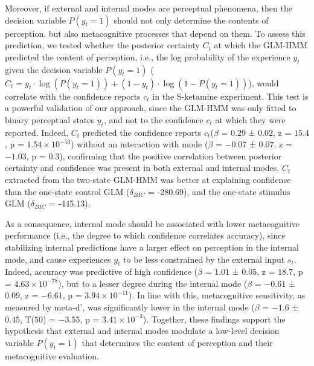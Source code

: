 \documentclass[
]{article}
\begin{document}
Moreover, if external and internal modes are perceptual phenomena, then
the decision variable \(P(y_t = 1)\) should not only determine the
contents of perception, but also metacognitive processes that depend on
them. To assess this prediction, we tested whether the posterior
certainty \(C_t\) at which the GLM-HMM predicted the content of
perception, i.e., the log probability of the experience \(y_t\) given
the decision variable \(P(y_t = 1)\)
(\(C_t = y_t \cdot \log(P(y_t = 1)) + (1 - y_t) \cdot \log(1 - P(y_t = 1))\)),
would correlate with the confidence reports \(c_t\) in the S-ketamine
experiment. This test is a powerful validation of our approach, since
the GLM-HMM was only fitted to binary perceptual states \(y_t\), and not
to the confidence \(c_t\) at which they were reported. Indeed, \(C_t\)
predicted the confidence reports \(c_t\)(\(\beta\) = \(0.29\) ±
\(0.02\), z = \(15.4\), p = \(\ensuremath{1.54\times 10^{-53}}\))
without an interaction with mode (\(\beta\) = \(-0.07\) ± \(0.07\), z =
\(-1.03\), p = \(0.3\)), confirming that the positive correlation
between posterior certainty and confidence was present in both external
and internal modes. \(C_t\) extracted from the two-state GLM-HMM was
better at explaining confidence than the one-state control GLM
(\(\delta_{BIC}\) = -280.69), and the one-state stimulus GLM
(\(\delta_{BIC}\) = -445.13).

As a consequence, internal mode should be associated with lower
metacognitive performance (i.e., the degree to which confidence
correlates accuracy), since stabilizing internal predictions have a
larger effect on perception in the internal mode, and cause experiences
\(y_t\) to be less constrained by the external input \(s_t\). Indeed,
accuracy was predictive of high confidence (\(\beta\) = \(1.01\) ±
\(0.05\), z = \(18.7\), p = \(\ensuremath{4.63\times 10^{-78}}\)), but
to a lesser degree during the internal mode (\(\beta\) = \(-0.61\) ±
\(0.09\), z = \(-6.61\), p = \(\ensuremath{3.94\times 10^{-11}}\)). In
line with this, metacognitive sensitivity, as measured by meta-d', was
significantly lower in the internal mode (\(\beta\) = \(-1.6\) ±
\(0.45\), T(\(50\)) = \(-3.55\), p =
\(\ensuremath{3.41\times 10^{-3}}\)). Together, these findings support
the hypothesis that external and internal modes modulate a low-level
decision variable \(P(y_t = 1)\) that determines the content of
perception and their metacognitive evaluation.
\end{document}
